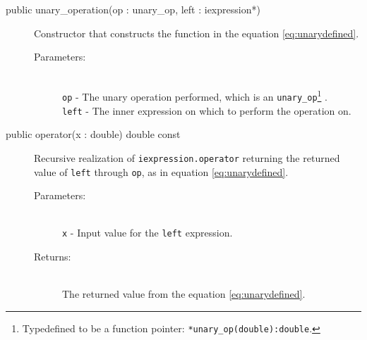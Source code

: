 \documentclass[a4paper,11pt]{kth-mag}
\begin{document}
\begin{description}
    \item[public unary\_operation(op : unary\_op, left : iexpression*)] Constructor 
    that constructs the function in the equation \ref{eq:unarydefined}. 
    \begin{description}
        \item[Parameters:]~\\
            \verb+op+ - The unary operation performed, which is an \texttt{unary\_op}\footnote{Typedefined to
            be a function pointer: \texttt{*unary\_op(double):double}.} .\\
            \verb+left+ - The inner expression on which to perform the
            operation on.
    \end{description}
\end{description}
\begin{description}
    \item[public operator(x : double) double const] 
    Recursive realization of \texttt{iexpression.operator} returning the
    returned value of \texttt{left} through \texttt{op}, as in equation
    \ref{eq:unarydefined}.
    \begin{description}
        \item[Parameters:]~\\
            \verb+x+ - Input value for the \texttt{left} expression.
        \item[Returns:]~\\
            The returned value from the equation \ref{eq:unarydefined}.
    \end{description}
\end{description}
\end{document}
